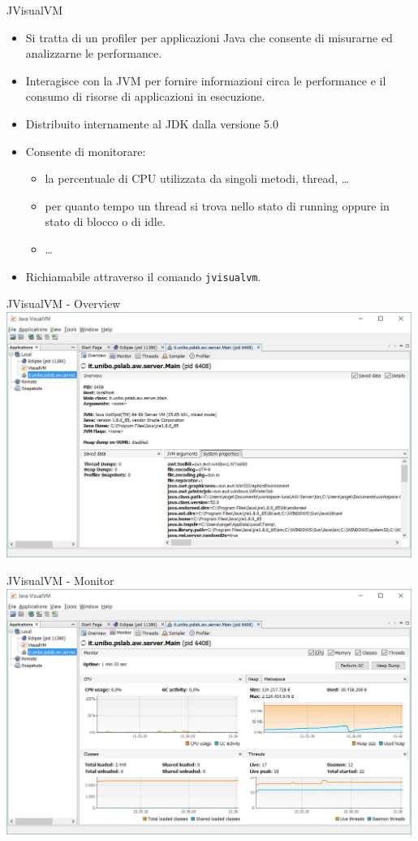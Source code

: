 \documentclass[presentation]{beamer}
\begin{document}
\begin{frame}{JVisualVM}
\begin{itemize}\itemsep10pt
\item Si tratta di un profiler per applicazioni Java che consente di misurarne ed analizzarne le performance.
\item Interagisce con la JVM per fornire informazioni circa le performance e il consumo di risorse di applicazioni in esecuzione.
\item Distribuito internamente al JDK dalla versione 5.0
\item Consente di monitorare:
\begin{itemize}
\item la percentuale di CPU utilizzata da singoli metodi, thread, \dots
\item per quanto tempo un thread si trova nello stato di running oppure in stato di blocco o di idle.
\item \dots
\end{itemize}
\item Richiamabile attraverso il comando \texttt{jvisualvm}.
\end{itemize}
\end{frame}

\begin{frame}{JVisualVM - Overview}
\centering
\includegraphics[width=0.99\textwidth]{img/jvisualvm-0}
\end{frame}

\begin{frame}{JVisualVM - Monitor}
\centering
\includegraphics[width=0.99\textwidth]{img/jvisualvm-1}
\end{frame}
\end{document}
